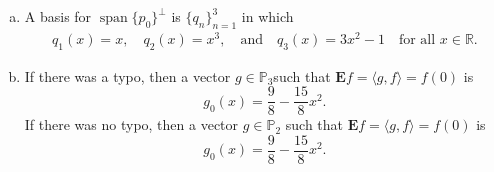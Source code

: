 \documentclass[12pt]{amsart}
\newcommand{\1}{\mathbbm{1}}
\numberwithin{equation}{section}
\numberwithin{Theorem}{section}
\theoremstyle{plain} %
\theoremstyle{definition}
\theoremstyle{remark}
\begin{document}
\begin{enumerate}[1.]
\begin{enumerate}[(a)]
\begin{proof}
\begin{enumerate}[i.]
	\item Multiplicative in the second part,
	\begin{align*}
		\langle f_1(x),cf_2(x)\rangle
		= \int_{-1}^{1}f_1(x) cf_2(x)\,dx 
		= c\int_{-1}^{1}f_1(x)f_2(x)\,dx 
		= c\langle f_1(x),f_2(x)\rangle .
	\end{align*}
	
	\item Conjugate symmetry,
	\begin{align*}
		\langle f_1(x),f_2(x)\rangle
		= \int_{-1}^{1}f_1(x)f_2(x)\,dx 
		&= \int_{-1}^{1}f_2(x)f_1(x)\,dx 
		= \langle f_2(x),f_1(x)\rangle
		\intertext{and since the domain is $\mathbb{R}$, }
		\langle f_2(x),f_1(x)\rangle
		&= \overline{\langle f_2(x),f_1(x)\rangle} .
	\end{align*}
	
	\item Positive definiteness,
	\begin{align*}
		\langle f(x),f(x)\rangle
		= \int_{-1}^{1}(f(x))^2\,dx 
		= \int_{-1}^{1}\bigg(\sum_{n=0}^{N}a_np_n(x)\bigg)^2\,dx 
	\end{align*}
	Because \((f(x))^2\) is positive on the 
	interval \([-1,1]\) when \(f(x)\neq0\) 
	the integral is also positive on that interval. 
	\vspace{-1.4em}
\end{enumerate} 	
\end{proof}

\item
A basis for \(\operatorname{span}\{p_{0}\}^\perp\)
is \(\{q_{n}\}_{n=1}^{3}\) in which
\begin{align*}
	q_1(x) = x, \quad
	q_2(x) = x^3, \quad
	\text{and} \quad
	q_3(x) = 3x^2-1 \quad
	\text{for all } x\in\mathbb{R}.
\end{align*}

\item
If there was a typo, then a vector \(g\in\mathbb{P}_{3}\)such that \(\mathbf{E}f = \langle g,f\rangle = f(0)\) is
\[g_0(x) = \frac{9}{8}-\frac{15}{8}x^2.\]
If there was no typo, then a vector \(g\in\mathbb{P}_{2}\) such that \(\mathbf{E}f = \langle g,f\rangle = f(0)\) is
\[g_0(x) = \frac{9}{8}-\frac{15}{8}x^2.\]


\end{enumerate}
\end{enumerate}
\end{document}
